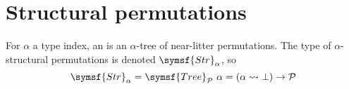 \section{Structural permutations}

\begin{definition}
    For \( \alpha \) a type index, an  is an \( \alpha \)-tree of near-litter permutations.
    The type of \( \alpha \)-structural permutations is denoted \( \symsf{Str}_\alpha \), so
    \[ \symsf{Str}_\alpha = \symsf{Tree}_{\mathcal P}\ \alpha = (\alpha \rightsquigarrow \bot) \to \mathcal P \]
\end{definition}
